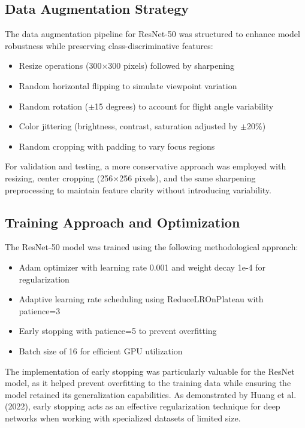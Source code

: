 \subsection{Data Augmentation Strategy}

The data augmentation pipeline for ResNet-50 was structured to enhance model robustness while preserving class-discriminative features:

\begin{itemize}
    \item Resize operations (300$\times$300 pixels) followed by sharpening
    \item Random horizontal flipping to simulate viewpoint variation
    \item Random rotation ($\pm$15 degrees) to account for flight angle variability
    \item Color jittering (brightness, contrast, saturation adjusted by $\pm$20\%)
    \item Random cropping with padding to vary focus regions
\end{itemize}

For validation and testing, a more conservative approach was employed with resizing, center cropping (256$\times$256 pixels), and the same sharpening preprocessing to maintain feature clarity without introducing variability\cite{jatit}.

\subsection{Training Approach and Optimization}

The ResNet-50 model was trained using the following methodological approach:

\begin{itemize}
    \item Adam optimizer with learning rate 0.001 and weight decay 1e-4 for regularization
    \item Adaptive learning rate scheduling using ReduceLROnPlateau with patience=3
    \item Early stopping with patience=5 to prevent overfitting
    \item Batch size of 16 for efficient GPU utilization
\end{itemize}

The implementation of early stopping was particularly valuable for the ResNet model, as it helped prevent overfitting to the training data while ensuring the model retained its generalization capabilities. As demonstrated by Huang et al. (2022), early stopping acts as an effective regularization technique for deep networks when working with specialized datasets of limited size\cite{mdpi}.

